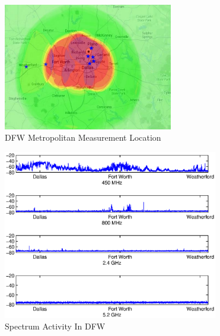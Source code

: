 \begin{figure}
\centering
\includegraphics[width=74mm]{figures/drivemap}
\vspace{-0.1in}
\caption{DFW Metropolitan Measurement Location}                                                                 
\label{fig:drivemap}
\vspace{-0.1in}
\end{figure}
   
\begin{figure}
\centering
\includegraphics[width=94mm]{figures/drivetest}
\vspace{-0.4in}
\caption{Spectrum Activity In DFW}                                                                 
\label{fig:drivetest}
\vspace{-0.3in}
\end{figure}

